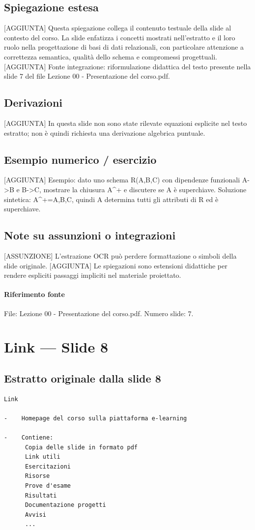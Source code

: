 \documentclass[11pt]{article}
\begin{document}
\subsection*{Spiegazione estesa}
[AGGIUNTA] Questa spiegazione collega il contenuto testuale della slide al contesto del corso. La slide enfatizza i concetti mostrati nell'estratto e il loro ruolo nella progettazione di basi di dati relazionali, con particolare attenzione a correttezza semantica, qualità dello schema e compromessi progettuali.
[AGGIUNTA] Fonte integrazione: riformulazione didattica del testo presente nella slide 7 del file Lezione 00 - Presentazione del corso.pdf.
\subsection*{Derivazioni}
[AGGIUNTA] In questa slide non sono state rilevate equazioni esplicite nel testo estratto; non è quindi richiesta una derivazione algebrica puntuale.
\subsection*{Esempio numerico / esercizio}
[AGGIUNTA] Esempio: dato uno schema R(A,B,C) con dipendenze funzionali A->B e B->C, mostrare la chiusura A^+ e discutere se A è superchiave. Soluzione sintetica: A^+={A,B,C}, quindi A determina tutti gli attributi di R ed è superchiave.
\subsection*{Note su assunzioni o integrazioni}
[ASSUNZIONE] L'estrazione OCR può perdere formattazione o simboli della slide originale.
[AGGIUNTA] Le spiegazioni sono estensioni didattiche per rendere espliciti passaggi impliciti nel materiale proiettato.
\paragraph{Riferimento fonte} File: Lezione 00 - Presentazione del corso.pdf. Numero slide: 7.
\section{Link --- Slide 8}
\subsection*{Estratto originale dalla slide 8}
\begin{lstlisting}
Link

-    Homepage del corso sulla piattaforma e-learning

-    Contiene:
      Copia delle slide in formato pdf
      Link utili
      Esercitazioni
      Risorse
      Prove d'esame
      Risultati
      Documentazione progetti
      Avvisi
      ...
\end{lstlisting}
\end{document}
